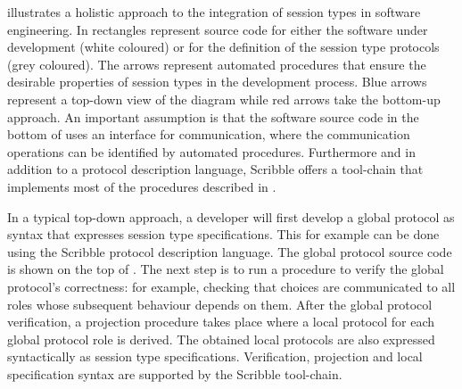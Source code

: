 illustrates a holistic approach to the integration of session
types in software engineering.
In  rectangles
represent source code for either the software
under development (white coloured) or for the definition
of the session type protocols (grey coloured).
The arrows
represent automated procedures that ensure
the desirable properties of session types
in the development process. Blue arrows represent
a top-down view of the diagram while red arrows take
the bottom-up approach.
An important assumption
is that the software source code in the
bottom of  uses an interface
for communication, where the communication
operations can be identified by automated
procedures.
%
Furthermore and in addition to a protocol description language,
Scribble offers a tool-chain that implements most of the procedures
described in .







In a typical top-down approach, a developer will first develop a global protocol
as syntax that expresses session type specifications.
This for example can be done
using the Scribble protocol description language.
The global protocol source code is shown
on the top of .
The next step is to run a procedure to verify the
global protocol's correctness: for example, checking that choices
are communicated to all roles whose subsequent behaviour depends on them.
After the global protocol verification, a projection
procedure takes place where a local protocol
for each global protocol role is derived.
The obtained local protocols are also expressed
syntactically as session type specifications.
Verification, projection and local specification
syntax are supported by the Scribble tool-chain.

